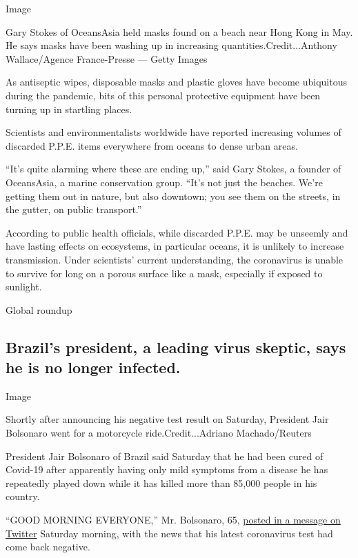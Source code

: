 Image

Gary Stokes of OceansAsia held masks found on a beach near Hong Kong in
May. He says masks have been washing up in increasing
quantities.Credit...Anthony Wallace/Agence France-Presse --- Getty
Images

As antiseptic wipes, disposable masks and plastic gloves have become
ubiquitous during the pandemic, bits of this personal protective
equipment have been turning up in startling places.

Scientists and environmentalists worldwide have reported increasing
volumes of discarded P.P.E. items everywhere from oceans to dense urban
areas.

``It's quite alarming where these are ending up,'' said Gary Stokes, a
founder of OceansAsia, a marine conservation group. ``It's not just the
beaches. We're getting them out in nature, but also downtown; you see
them on the streets, in the gutter, on public transport.''

According to public health officials, while discarded P.P.E. may be
unseemly and have lasting effects on ecosystems, in particular oceans,
it is unlikely to increase transmission. Under scientists' current
understanding, the coronavirus is unable to survive for long on a porous
surface like a mask, especially if exposed to sunlight.

Global roundup

\hypertarget{brazils-president-a-leading-virus-skeptic-says-he-is-no-longer-infected}{%
\subsection{Brazil's president, a leading virus skeptic, says he is no
longer
infected.}\label{brazils-president-a-leading-virus-skeptic-says-he-is-no-longer-infected}}

Image

Shortly after announcing his negative test result on Saturday, President
Jair Bolsonaro went for a motorcycle ride.Credit...Adriano
Machado/Reuters

President Jair Bolsonaro of Brazil said Saturday that he had been cured
of Covid-19 after apparently having only mild symptoms from a disease he
has repeatedly played down while it has killed more than 85,000 people
in his country.

``GOOD MORNING EVERYONE,'' Mr. Bolsonaro, 65,
\href{https://twitter.com/jairbolsonaro/status/1286994557440348160?s=20}{posted
in a message on Twitter} Saturday morning, with the news that his latest
coronavirus test had come back negative.

